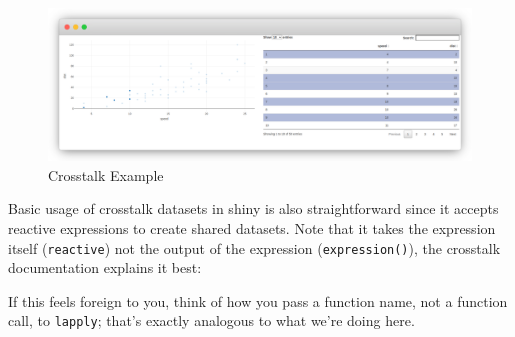 \documentclass[
]{krantz}
\renewenvironment{quote}{\begin{VF}}{\end{VF}}
\begin{document}
\begin{figure}
\centering
\includegraphics{images/crosstalk.png}
\caption{Crosstalk Example}
\end{figure}

Basic usage of crosstalk datasets in shiny is also straightforward since it accepts reactive expressions to create shared datasets. Note that it takes the expression itself (\texttt{reactive}) not the output of the expression (\texttt{expression()}), the crosstalk documentation explains it best:

\begin{quote}
If this feels foreign to you, think of how you pass a function name, not a function call, to \texttt{lapply}; that's exactly analogous to what we're doing here.

\end{quote}
\end{document}
